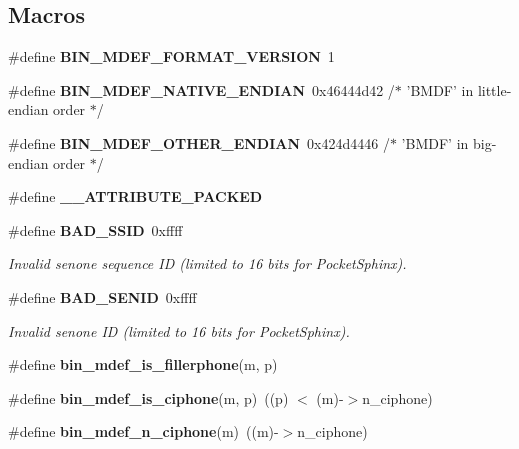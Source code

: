 \subsection*{Macros}
\begin{DoxyCompactItemize}
\item 
\#define {\bfseries B\-I\-N\-\_\-\-M\-D\-E\-F\-\_\-\-F\-O\-R\-M\-A\-T\-\_\-\-V\-E\-R\-S\-I\-O\-N}~1\label{bin__mdef_8h_a200a7e1836fa80ffe56b15334b1a8d1d}

\item 
\#define {\bfseries B\-I\-N\-\_\-\-M\-D\-E\-F\-\_\-\-N\-A\-T\-I\-V\-E\-\_\-\-E\-N\-D\-I\-A\-N}~0x46444d42 /$\ast$ '\-B\-M\-D\-F' in little-\/endian order $\ast$/\label{bin__mdef_8h_a9d58ffda11ea44f2681848072cb64ddd}

\item 
\#define {\bfseries B\-I\-N\-\_\-\-M\-D\-E\-F\-\_\-\-O\-T\-H\-E\-R\-\_\-\-E\-N\-D\-I\-A\-N}~0x424d4446  /$\ast$ '\-B\-M\-D\-F' in big-\/endian order $\ast$/\label{bin__mdef_8h_aafe4efcf837bc5c4b2392cd7e77c1ebd}

\item 
\#define {\bfseries \-\_\-\-\_\-\-A\-T\-T\-R\-I\-B\-U\-T\-E\-\_\-\-P\-A\-C\-K\-E\-D}\label{bin__mdef_8h_aefbcc16d264f773388235497c2e3518f}

\item 
\#define {\bf B\-A\-D\-\_\-\-S\-S\-I\-D}~0xffff\label{bin__mdef_8h_a8ee283c316e9f4aa8e6d18c1d44026bc}

\begin{DoxyCompactList}\small\item\em Invalid senone sequence I\-D (limited to 16 bits for Pocket\-Sphinx). \end{DoxyCompactList}\item 
\#define {\bf B\-A\-D\-\_\-\-S\-E\-N\-I\-D}~0xffff\label{bin__mdef_8h_ab6c771eca798ab8c94e0933a1f8daafc}

\begin{DoxyCompactList}\small\item\em Invalid senone I\-D (limited to 16 bits for Pocket\-Sphinx). \end{DoxyCompactList}\item 
\#define {\bfseries bin\-\_\-mdef\-\_\-is\-\_\-fillerphone}(m, p)
\item 
\#define {\bfseries bin\-\_\-mdef\-\_\-is\-\_\-ciphone}(m, p)~((p) $<$ (m)-\/$>$n\-\_\-ciphone)\label{bin__mdef_8h_ad1440dcf8f6df7daf54dca1c85b7aa9e}

\item 
\#define {\bfseries bin\-\_\-mdef\-\_\-n\-\_\-ciphone}(m)~((m)-\/$>$n\-\_\-ciphone)\label{bin__mdef_8h_a3bf9a556739b5b6651eb2bfa72fcb427}


\end{DoxyCompactItemize}
